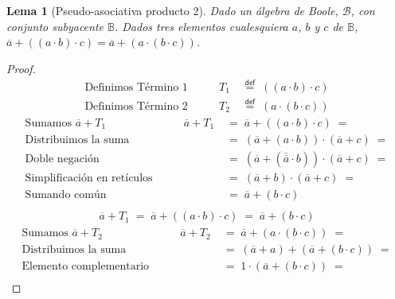 \documentclass[final,12pt,a4paper,twoside,fleqn]{extbook}
\newcommand{\mathdef}{\ensuremath{\stackrel{\mathsf{def}}{{}={}}}}
\newcommand{\setB}{\ensuremath{\mathbb{B}}}
\newtheorem{lem}[thm]{Lema}
\theoremstyle{definition}
\theoremstyle{remark}
\begin{document}
\begin{lem}[Pseudo-asociativa producto 2]
Dado un álgebra de Boole, \(\mathscr{B}\), con conjunto subyacente \(\setB\). Dados tres elementos cualesquiera \(a\), \(b\) y \(c\) de \(\setB\), \( \overline{a} + ( ( a \cdot b ) \cdot c ) = \overline{a} + ( a \cdot ( b \cdot c ) )\).
\end{lem}



\begin{proof}
\begin{align}
\text{Definimos Término 1}\qquad& T_1 \;&\mathdef\; \left( \left( a \cdot  b \right) \cdot  c \right) \\
\text{Definimos Término 2}\qquad& T_2 \;&\mathdef\; \left( a \cdot \left( b \cdot c \right) \right)
\end{align}
\begin{align}
\text{Sumamos \(\overline{a} + T_1\)}\qquad& \overline{a} + T_1 \;&=\; \overline{a} + \left( \left( a \cdot b \right) \cdot c \right) \;=\\
\text{Distribuimos la suma}\qquad&{}&=\; \left( \overline{a} + \left( a \cdot b \right) \right) \cdot \left( \overline{a} + c \right) \;=\\
\text{Doble negación}\qquad&{}&=\; \left( \overline{a} + \left( \overline{\overline{a}} \cdot b \right) \right) \cdot \left( \overline{a} + c \right) \;=\\
\text{Simplificación en retículos}\qquad&{}&=\; \left( \overline{a} + b \right) \cdot \left( \overline{a} + c \right) \;=\\
\text{Sumando común}\qquad&{}&=\; \overline{a} + \left( b \cdot  c \right) \;\;\\
\end{align}
\begin{align}
\overline{a} + T_1 \;=\; \overline{a} + \left( \left( a \cdot b \right) \cdot c \right) \;=\; \overline{a} + \left( b \cdot c \right)
\end{align}
\begin{align}
\text{Sumamos \(\overline{a} + T_2\)}\qquad& \overline{a} + T_2 \;&=\; \overline{a} + \left( a \cdot \left( b \cdot c \right) \right) \;=\\
\text{Distribuimos la suma}\qquad&{}&=\; \left( \overline{a} + a \right) + \left( \overline{a} + \left( b \cdot c \right) \right) \;=\\
\text{Elemento complementario}\qquad&{}&=\; 1 \cdot \left( \overline{a} + \left( b \cdot c \right) \right) \;=\\

\end{align}
\end{proof}
\end{document}
